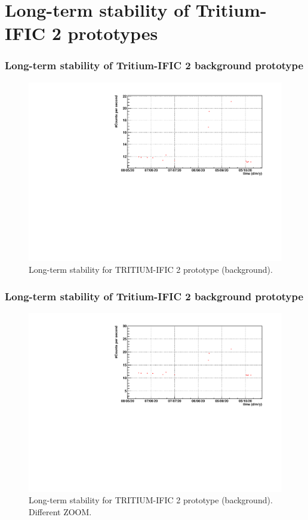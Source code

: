 \documentclass{beamer}
\begin{document}
\section{Long-term stability of Tritium-IFIC 2 prototypes}
\begin{frame}
\frametitle{Long-term stability of Tritium-IFIC 2 background prototype}

\begin{figure}[hbtp]
\centering
\includegraphics[scale=0.6]{Imagenes/3Long-term_Stability/Monitorizacion_Fondo_rojo.pdf}
\caption{Long-term stability for TRITIUM-IFIC 2 prototype (background).}
\end{figure}

\end{frame}

\begin{frame}
\frametitle{Long-term stability of Tritium-IFIC 2 background prototype}

\begin{figure}[hbtp]
\centering
\includegraphics[scale=0.6]{Imagenes/3Long-term_Stability/Monitorizacion_Fondo_rojo_ZOOM.pdf}
\caption{Long-term stability for TRITIUM-IFIC 2 prototype (background). Different ZOOM.}
\end{figure}

\end{frame}
\end{document}
